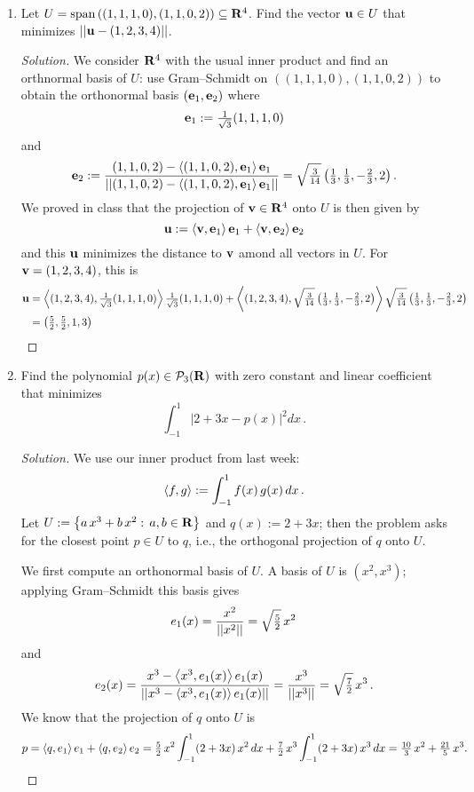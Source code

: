 \documentclass[11pt]{amsart}
\begin{document}
\begin{enumerate}[(1)]

\item Let $U = \operatorname{span} \left( (1,1,1,0), (1,1,0,2) \right) \subseteq \mathbf{R}^4$.
Find the vector $\mathbf u \in U$ that minimizes $\left|\left|  \mathbf u - (1,2,3,4)  \right|\right|$.

\begin{proof}[Solution]
We consider $\mathbf{R}^4$ with the usual inner product and find an orthnormal basis of $U$: use Gram--Schmidt on $\left( (1,1,1,0), (1,1,0,2) \right)$ to obtain the orthonormal basis $(\mathbf e_1, \mathbf e_2)$ where
\[
  \mathbf e_1 := \tfrac{ 1 }{ \sqrt 3 } (1,1,1,0)
\]
and
\[
  \mathbf e_2
  := \frac{ (1,1,0,2) - \left<  (1,1,0,2) ,  \mathbf e_1  \right> \mathbf e_1 }{ \left|\left|  (1,1,0,2) - \left<  (1,1,0,2) ,  \mathbf e_1  \right> \mathbf e_1  \right|\right| }
  = \sqrt{ \tfrac{ 3 }{ 14 } } \left( \tfrac 1 3, \tfrac 1 3, - \tfrac 2 3, 2 \right) .
\]
We proved in class that the projection of $\mathbf v \in \mathbf{R}^4$ onto $U$ is then given by
\[
  \mathbf u := \left< \mathbf v, \mathbf e_1 \right> \mathbf e_1 + \left< \mathbf v, \mathbf e_2 \right> \mathbf e_2
\]
and this $\mathbf u$ minimizes the distance to $\mathbf v$ amond all vectors in $U$.
For $\mathbf v = (1,2,3,4)$, this is
\begin{align*}
  \mathbf u
  &= \left<  (1,2,3,4) ,  \tfrac{ 1 }{ \sqrt 3 } (1,1,1,0)  \right> \tfrac{ 1 }{ \sqrt 3 } (1,1,1,0) + \left<  (1,2,3,4) ,  \sqrt{ \tfrac{ 3 }{ 14 } } \left( \tfrac 1 3, \tfrac 1 3, - \tfrac 2 3, 2 \right)  \right> \sqrt{ \tfrac{ 3 }{ 14 } } \left( \tfrac 1 3, \tfrac 1 3, - \tfrac 2 3, 2 \right) \\
  &= \left( \tfrac 5 2, \tfrac 5 2, 1, 3 \right) \qedhere
\end{align*}

\end{proof}

\item Find the polynomial $p(x) \in \mathcal{P}_3(\mathbf{R})$ with zero constant and linear coefficient that minimizes
\[
  \int_{ -1 }^1 \left| 2+3x-p(x) \right|^2 dx \, .
\]

\begin{proof}[Solution]
We use our inner product from last week:
\[
  \left< f, g \right> := \int_{ -1 }^1 f(x) \, g(x) \, dx \, .
\]
Let $U := \left\{ a \, x^3 + b \, x^2 : \, a, b \in \mathbf{R} \right\}$ and $q(x) := 2+3x$; then the problem asks for the closest point $p \in U$ to $q$, i.e., the orthogonal projection of $q$ onto $U$.

We first compute an orthonormal basis of $U$.
A basis of $U$ is $\left( x^2, x^3 \right)$; applying Gram--Schmidt this basis gives
\[
  e_1(x) = \frac{ x^2 }{ \left|\left|  x^2  \right|\right| } = \sqrt{ \tfrac 5 2 } \, x^2
\]
and
\[
  e_2(x)
  = \frac{ x^3 - \left<  x^3 ,  e_1(x)  \right> e_1(x) }{ \left|\left|  x^3 - \left<  x^3 ,  e_1(x)  \right> e_1(x)  \right|\right| }
  = \frac{ x^3 }{ \left|\left|  x^3  \right|\right| }
  = \sqrt{ \tfrac 7 2 } \, x^3 \, .
\]
We know that the projection of $q$ onto $U$ is
\[
  p = \left<  q ,  e_1  \right> e_1 + \left<  q ,  e_2  \right> e_2
  = \tfrac 5 2 \, x^2 \int_{ -1 }^1 (2+3x) \, x^2 \, dx + \tfrac 7 2 \, x^3 \int_{ -1 }^1 (2+3x) \, x^3 \, dx
  = \tfrac{ 10 }{ 3 } \, x^2 + \tfrac{ 21 }{ 5 } \, x^3 . \qedhere
\]
\end{proof}


\end{enumerate}
\end{document}
